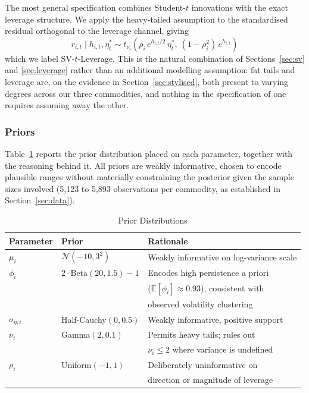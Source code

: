 \documentclass[preprint,12pt,authoryear]{elsarticle}
\begin{document}
The most general specification combines Student-$t$ innovations with the exact leverage structure. We apply the heavy-tailed assumption to the standardised residual orthogonal to the leverage channel, giving
\begin{equation}
  r_{i,t} \mid h_{i,t}, \eta_t^* \sim t_{\nu_i}\!\left(\rho_i\, e^{h_{i,t}/2}\, \eta_t^*,\ (1-\rho_i^2)\, e^{h_{i,t}}\right)
  \label{eq:sv_t_leverage}
\end{equation}
which we label SV-$t$-Leverage. This is the natural combination of Sections~\ref{sec:sv} and \ref{sec:leverage} rather than an additional modelling assumption: fat tails and leverage are, on the evidence in Section~\ref{sec:stylised}, both present to varying degrees across our three commodities, and nothing in the specification of one requires assuming away the other.

\subsubsection{Priors}

Table~\ref{tab:priors} reports the prior distribution placed on each parameter, together with the reasoning behind it. All priors are weakly informative, chosen to encode plausible ranges without materially constraining the posterior given the sample sizes involved (5,123 to 5,893 observations per commodity, as established in Section~\ref{sec:data}).

\begin{table}[htbp]
\centering
\caption{Prior Distributions}
\label{tab:priors}
\small
\begin{tabular}{lll}
\toprule
Parameter & Prior & Rationale \\
\midrule
$\mu_i$ & $\mathcal{N}(-10, 3^2)$ & Weakly informative on log-variance scale \\
$\phi_i$ & $2\cdot\text{Beta}(20, 1.5) - 1$ & Encodes high persistence a priori \\
& & ($\mathbb{E}[\phi_i]\approx 0.93$), consistent with \\
& & observed volatility clustering \\
$\sigma_{\eta,i}$ & Half-Cauchy$(0, 0.5)$ & Weakly informative, positive support \\
$\nu_i$ & Gamma$(2, 0.1)$ & Permits heavy tails; rules out \\
& & $\nu_i \leq 2$ where variance is undefined \\
$\rho_i$ & Uniform$(-1, 1)$ & Deliberately uninformative on \\
& & direction or magnitude of leverage \\
\bottomrule
\end{tabular}
\end{table}
\end{document}
